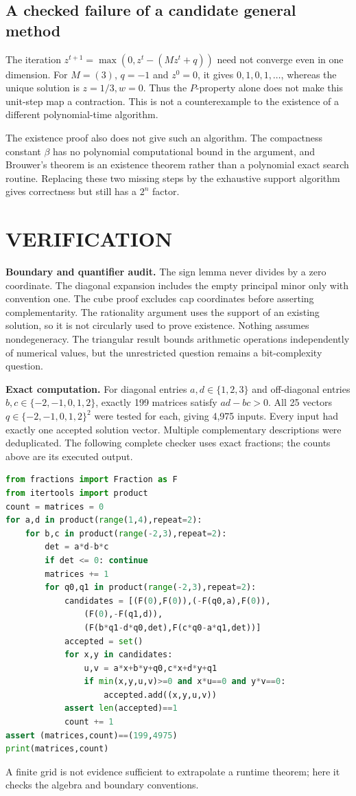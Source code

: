 \documentclass[11pt,a4paper]{article}
\theoremstyle{definition}\newtheorem{definition}[theorem]{Definition}
\theoremstyle{remark}\newtheorem{remark}[theorem]{Remark}
\newcommand{\1}{\mathbf 1}
\begin{document}
\subsection{A checked failure of a candidate general method}
The iteration $z^{t+1}=\max(0,z^t-(Mz^t+q))$ need not converge even in one dimension. For $M=(3)$, $q=-1$ and $z^0=0$, it gives $0,1,0,1,\ldots$, whereas the unique solution is $z=1/3,w=0$. Thus the $P$-property alone does not make this unit-step map a contraction. This is not a counterexample to the existence of a different polynomial-time algorithm.

The existence proof also does not give such an algorithm. The compactness constant $\beta$ has no polynomial computational bound in the argument, and Brouwer's theorem is an existence theorem rather than a polynomial exact search routine. Replacing these two missing steps by the exhaustive support algorithm gives correctness but still has a $2^n$ factor.

\section{VERIFICATION}
\textbf{Boundary and quantifier audit.} The sign lemma never divides by a zero coordinate. The diagonal expansion includes the empty principal minor only with convention one. The cube proof excludes cap coordinates before asserting complementarity. The rationality argument uses the support of an existing solution, so it is not circularly used to prove existence. Nothing assumes nondegeneracy. The triangular result bounds arithmetic operations independently of numerical values, but the unrestricted question remains a bit-complexity question.

\textbf{Exact computation.} For diagonal entries $a,d\in\{1,2,3\}$ and off-diagonal entries $b,c\in\{-2,-1,0,1,2\}$, exactly 199 matrices satisfy $ad-bc>0$. All 25 vectors $q\in\{-2,-1,0,1,2\}^2$ were tested for each, giving 4,975 inputs. Every input had exactly one accepted solution vector. Multiple complementary descriptions were deduplicated. The following complete checker uses exact fractions; the counts above are its executed output.
\begin{lstlisting}[language=Python]
from fractions import Fraction as F
from itertools import product
count = matrices = 0
for a,d in product(range(1,4),repeat=2):
    for b,c in product(range(-2,3),repeat=2):
        det = a*d-b*c
        if det <= 0: continue
        matrices += 1
        for q0,q1 in product(range(-2,3),repeat=2):
            candidates = [(F(0),F(0)),(-F(q0,a),F(0)),
                (F(0),-F(q1,d)),
                (F(b*q1-d*q0,det),F(c*q0-a*q1,det))]
            accepted = set()
            for x,y in candidates:
                u,v = a*x+b*y+q0,c*x+d*y+q1
                if min(x,y,u,v)>=0 and x*u==0 and y*v==0:
                    accepted.add((x,y,u,v))
            assert len(accepted)==1
            count += 1
assert (matrices,count)==(199,4975)
print(matrices,count)
\end{lstlisting}
A finite grid is not evidence sufficient to extrapolate a runtime theorem; here it checks the algebra and boundary conventions.
\end{document}
